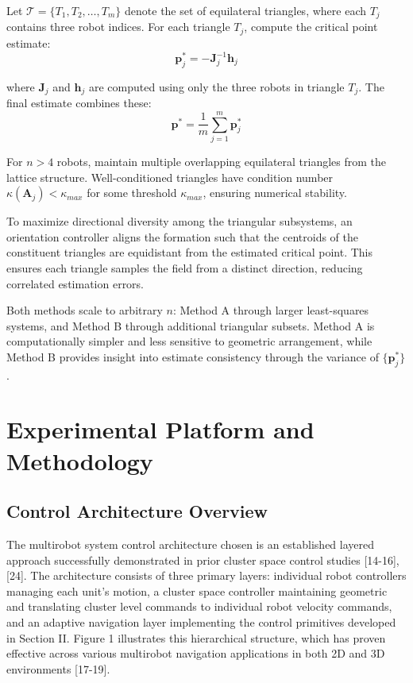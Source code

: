 \documentclass[lettersize,journal]{IEEEtran}
\begin{document}
Let $\mathcal{T} = \{T_1, T_2, \ldots, T_m\}$ denote the set of equilateral triangles, where each $T_j$ contains three robot indices. For each triangle $T_j$, compute the critical point estimate:
\begin{equation}
\mathbf{p}^*_j = -\mathbf{J}_j^{-1}\mathbf{h}_j
\end{equation}

where $\mathbf{J}_j$ and $\mathbf{h}_j$ are computed using only the three robots in triangle $T_j$. The final estimate combines these:
\begin{equation}
\mathbf{p}^* = \frac{1}{m}\sum_{j=1}^{m} \mathbf{p}^*_j
\end{equation}

For $n > 4$ robots, maintain multiple overlapping equilateral triangles from the lattice structure. Well-conditioned triangles have condition number $\kappa(\mathbf{A}_j) < \kappa_{max}$ for some threshold $\kappa_{max}$, ensuring numerical stability.

To maximize directional diversity among the triangular subsystems, an orientation controller aligns the formation such that the centroids of the constituent triangles are equidistant from the estimated critical point. This ensures each triangle samples the field from a distinct direction, reducing correlated estimation errors.

Both methods scale to arbitrary $n$: Method A through larger least-squares systems, and Method B through additional triangular subsets. Method A is computationally simpler and less sensitive to geometric arrangement, while Method B provides insight into estimate consistency through the variance of $\{\mathbf{p}^*_j\}$.


\section{Experimental Platform and Methodology}

\subsection{Control Architecture Overview}

The multirobot system control architecture chosen is an established layered approach successfully demonstrated in prior cluster space control studies [14-16], [24]. The architecture consists of three primary layers: individual robot controllers managing each unit's motion, a cluster space controller maintaining geometric and translating cluster level commands to individual robot velocity commands, and an adaptive navigation layer implementing the control primitives developed in Section II. Figure 1 illustrates this hierarchical structure, which has proven effective across various multirobot navigation applications in both 2D and 3D environments [17-19].
\end{document}
